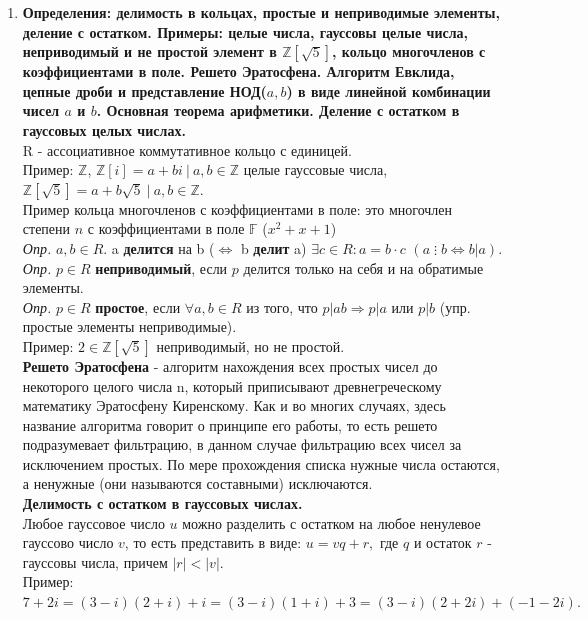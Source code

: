 \documentclass[12pt, oneside]{book}
\theoremstyle{definition}
\newcommand{\bb}[1]{\mathbb{#1}}
\begin{document}
\begin{enumerate}
\item \textbf{Определения: делимость в кольцах, простые и неприводимые элементы, деление с остатком. Примеры: целые числа, гауссовы целые числа, неприводимый и не простой элемент в $\bb{Z}[\sqrt{5}]$, кольцо многочленов с коэффициентами в поле. Решето Эратосфена. Алгоритм Евклида, цепные дроби и представление НОД($a,b$) в виде линейной комбинации чисел $a$ и $b$. Основная теорема арифметики. Деление с остатком в гауссовых целых числах.}\\
R - ассоциативное коммутативное кольцо с единицей.\\
Пример: $\mathbb{Z}$, $\mathbb{Z}[i] = {a + bi \ | \ a,b \in \mathbb{Z} }$ целые гауссовые числа, $\mathbb{Z}[\sqrt{5}] = { a + b\sqrt{5} \ | \ a, b \in \mathbb{Z}}$. \\
Пример кольца многочленов с коэффициентами в поле: это многочлен степени $n$ с коэффициентами в поле $\mathbb{F}$ ($x^2 + x + 1$) \\
\textit{Опр.} $a, b \in R$. a \textbf{делится} на b ($\Longleftrightarrow$ b \textbf{делит} a) $\exists c \in R : a = b \cdot c$ $(a \mathrel{\vdots} b \Longleftrightarrow b | a)$. \\
\textit{Опр.} $p \in R$ \textbf{неприводимый}, если $p$ делится только на себя и на обратимые элементы. \\
\textit{Опр.} $p \in R$ \textbf{простое}, если $\forall a,b \in R$ из того, что $p | ab \Longrightarrow p|a$ или $p|b $  (упр. простые элементы неприводимые). \\
Пример: $2 \in \mathbb{Z}[\sqrt{5}] $ неприводимый, но не простой. \\
\textbf{Решето Эратосфена} - алгоритм нахождения всех простых чисел до некоторого целого числа n, который приписывают древнегреческому математику Эратосфену Киренскому. Как и во многих случаях, здесь название алгоритма говорит о принципе его работы, то есть решето подразумевает фильтрацию, в данном случае фильтрацию всех чисел за исключением простых. По мере прохождения списка нужные числа остаются, а ненужные (они называются составными) исключаются. \\
\textbf{Делимость с остатком в гауссовых числах.} \\
Любое гауссовое число $u$ можно разделить с остатком на любое ненулевое гауссово число $v$, то есть представить в виде: $u = vq + r,$ где $q$ и остаток $r$ - гауссовы числа, причем $|r| < |v|.$\\
Пример: $7 + 2i = (3 - i)(2 + i) + i = (3 - i)(1 + i) + 3 = (3 - i)(2 + 2i) + (-1 - 2i).$ \\

\end{enumerate}
\end{document}
